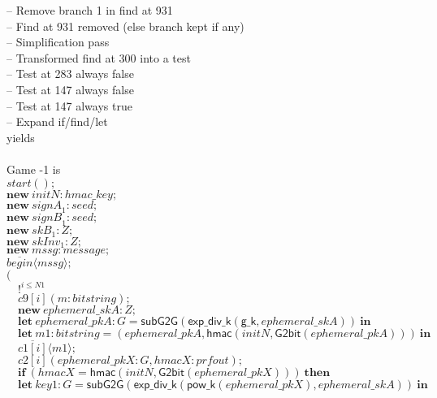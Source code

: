 \documentclass{article}
\newcommand{\cinput}[2]{{#1}({#2})}
\newcommand{\coutput}[2]{\overline{#1}\langle{#2}\rangle}
\newcommand{\kw}[1]{\mathbf{#1}}
\newcommand{\kwf}[1]{\mathsf{#1}}
\newcommand{\var}[1]{\mathit{#1}}
\newcommand{\kwt}[1]{\mathit{#1}}
\newcommand{\kwp}[1]{\mathit{#1}}
\newcommand{\kwc}[1]{\mathit{#1}}
\begin{document}
\begin{tabbing}
\qquad -- Remove branch 1 in find at 931\\
\qquad -- Find at 931 removed (else branch kept if any)\\
\quad -- Simplification pass\\
\qquad -- Transformed find at 300 into a test\\
\qquad -- Test at 283 always false\\
\qquad -- Test at 147 always false\\
\qquad -- Test at 147 always true\\
\quad -- Expand if/find/let\\
yields\\
\\
Game -1 is\\
\>$\cinput{\kwc{start}}{};$\\
\>$\kw{new}\ \var{initN}: \kwt{hmac{\_}key};$\\
\>$\kw{new}\ \var{signA}_{1}: \kwt{seed};$\\
\>$\kw{new}\ \var{signB}_{1}: \kwt{seed};$\\
\>$\kw{new}\ \var{skB}_{1}: \kwt{Z};$\\
\>$\kw{new}\ \var{skInv}_{1}: \kwt{Z};$\\
\>$\kw{new}\ \var{mssg}: \kwt{message};$\\
\>$\coutput{\kwc{begin}}{\var{mssg}};$\\
\>$($\\
\>$\quad !^{\var{i} \leq \kwp{N1}}$\\
\>$\quad \cinput{\kwc{c9}[\var{i}]}{\var{m}: \kwt{bitstring}};$\\
\>$\quad \kw{new}\ \var{ephemeral{\_}skA}: \kwt{Z};$\\
\>$\quad \kw{let}\ \var{ephemeral{\_}pkA}: \kwt{G} = \kwf{subG2G}(\kwf{exp{\_}div{\_}k}(\kwf{g{\_}k}, \var{ephemeral{\_}skA}))\ \kw{in}$\\
\>$\quad \kw{let}\ \var{m1}: \kwt{bitstring} = \kwf{}(\var{ephemeral{\_}pkA}, \kwf{hmac}(\var{initN}, \kwf{G2bit}(\var{ephemeral{\_}pkA})))\ \kw{in}$\\
\>$\quad \coutput{\kwc{c1}[\var{i}]}{\var{m1}};$\\
\>$\quad \cinput{\kwc{c2}[\var{i}]}{\var{ephemeral{\_}pkX}: \kwt{G}, \var{hmacX}: \kwt{prfout}};$\\
\>$\quad \kw{if}\ (\var{hmacX}  =  \kwf{hmac}(\var{initN}, \kwf{G2bit}(\var{ephemeral{\_}pkX})))\ \kw{then}$\\
\>$\quad \kw{let}\ \var{key1}: \kwt{G} = \kwf{subG2G}(\kwf{exp{\_}div{\_}k}(\kwf{pow{\_}k}(\var{ephemeral{\_}pkX}), \var{ephemeral{\_}skA}))\ \kw{in}$\\

\end{tabbing}
\end{document}
